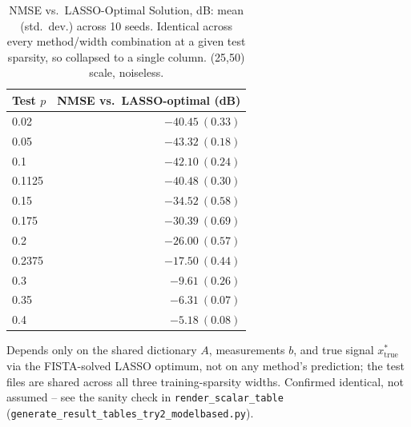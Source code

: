 \begin{table}[htbp]
\begin{minipage}{\linewidth}
\end{minipage}
\end{table}

\begin{table}[htbp]
\centering
\caption{NMSE vs.\ LASSO-Optimal Solution, dB: mean (std.\ dev.) across 10 seeds. Identical across every method/width combination at a given test sparsity, so collapsed to a single column. (25,50) scale, noiseless.}
\label{tab:exp2try2mb-nmse-lassoopt}
\begin{tabular}{@{} l r @{}}
\toprule
Test $p$ & NMSE vs.\ LASSO-optimal (dB) \\
\midrule
0.02 & $-40.45\ (0.33)$ \\
0.05 & $-43.32\ (0.18)$ \\
0.1 & $-42.10\ (0.24)$ \\
0.1125 & $-40.48\ (0.30)$ \\
0.15 & $-34.52\ (0.58)$ \\
0.175 & $-30.39\ (0.69)$ \\
0.2 & $-26.00\ (0.57)$ \\
0.2375 & $-17.50\ (0.44)$ \\
0.3 & $-9.61\ (0.26)$ \\
0.35 & $-6.31\ (0.07)$ \\
0.4 & $-5.18\ (0.08)$ \\
\bottomrule
\end{tabular}
\vspace{2pt}
\begin{minipage}{\linewidth}\footnotesize
Depends only on the shared dictionary $A$, measurements $b$, and true signal $x^*_{\text{true}}$ via the FISTA-solved LASSO optimum, not on any method's prediction; the test files are shared across all three training-sparsity widths. Confirmed identical, not assumed -- see the sanity check in \texttt{render\_scalar\_table} (\texttt{generate\_result\_tables\_try2\_modelbased.py}).
\end{minipage}
\end{table}

